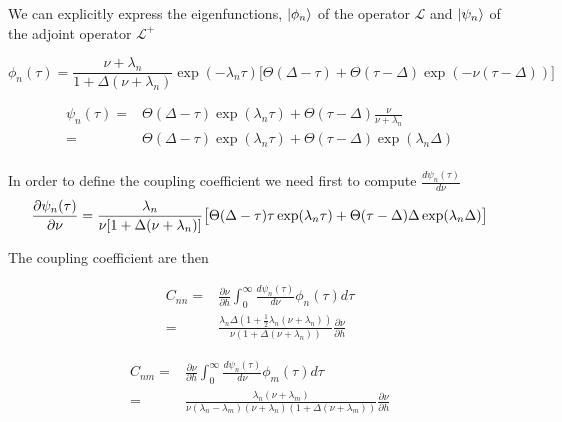 \documentclass[a4paper,11pt,twoside]{article}
\numberwithin{equation}{section}
\begin{document}
We can explicitly express the eigenfunctions, $\ket{\phi_n}$ of the operator $\mathcal{L}$ and $\ket{\psi_n}$ of  the adjoint operator $\mathcal{L}^+$


\begin{equation}
\phi_n(\tau)= \frac{\nu+\lambda_n}{1+\Delta(\nu+\lambda_n)}\exp(-\lambda_n\tau)\big[\Theta(\Delta-\tau) +  \Theta(\tau-\Delta) \exp(-\nu(\tau-\Delta))\big]
\end{equation}


\begin{align}
\psi_n(\tau)=&\Theta(\Delta-\tau)\exp(\lambda_n\tau) +  \Theta(\tau-\Delta) \frac{\nu}{\nu+\lambda_n}\\
=&\Theta(\Delta-\tau)\exp(\lambda_n\tau) +  \Theta(\tau-\Delta) \exp(\lambda_n\Delta)\\
\end{align}



In order to define the coupling coefficient we need first to compute $\frac{d\psi_n(\tau)}{d\nu}$ 
\begin{equation}
\frac{\partial\psi_n(\tau)}{\partial\nu}=\frac{\lambda_n}{\nu[1+\Delta(\nu+\lambda_n)]}\big[\Theta(\Delta-\tau)\tau\exp(\lambda_n\tau) +  \Theta(\tau-\Delta)\Delta \exp(\lambda_n\Delta)\big]\\
\end{equation}

The coupling coefficient are then 

\begin{align}
C_{nn}=&\frac{\partial \nu}{\partial h}\int_0^\infty\frac{d\psi_n(\tau)}{d\nu}\phi_n(\tau)d\tau \nonumber\\
=&\frac{\lambda_n\Delta(1+\frac{1}{2}\lambda_n(\nu+\lambda_n))}{\nu(1+\Delta(\nu+\lambda_n))}\frac{\partial \nu}{\partial h}
\end{align}


\begin{align}
C_{nm}=&\frac{\partial \nu}{\partial h}\int_0^\infty\frac{d\psi_n(\tau)}{d\nu}\phi_m(\tau)d\tau \nonumber\\
=&\frac{\lambda_n(\nu+\lambda_m)}{\nu(\lambda_n-\lambda_m)(\nu+\lambda_n)(1+\Delta(\nu+\lambda_m))}\frac{\partial \nu}{\partial h}
\end{align}
\end{document}
